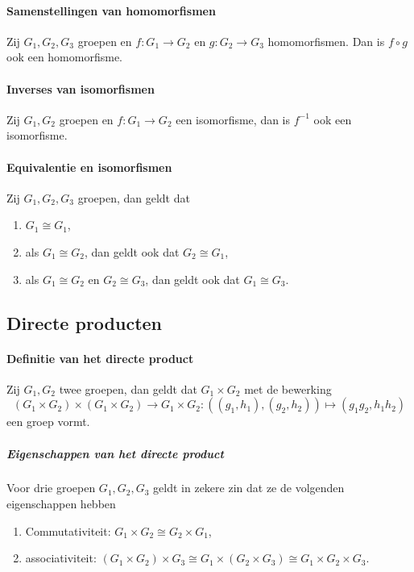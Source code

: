 \paragraph{Samenstellingen van homomorfismen} Zij \(G_{1},G_{2},G_{3}\) groepen en \(f\colon G_{1}\to G_{2}\) en \(g\colon G_{2}\to G_{3}\) homomorfismen. Dan is \(f\circ g\) ook een homomorfisme.

\paragraph{Inverses van isomorfismen} Zij \(G_{1},G_{2}\) groepen en \(f\colon G_{1}\to G_{2}\) een isomorfisme, dan is \(f^{-1}\) ook een isomorfisme.

\paragraph{Equivalentie en isomorfismen} Zij \(G_{1},G_{2},G_{3}\) groepen, dan geldt dat
\begin{enumerate}
    \item \(G_{1}\cong G_{1}\),
    \item als \(G_{1}\cong G_{2}\), dan geldt ook dat \(G_{2}\cong G_{1}\),
    \item als \(G_{1}\cong G_{2}\) en \(G_{2}\cong G_{3}\), dan geldt ook dat \(G_{1}\cong G_{3}\).
\end{enumerate}

\subsection{Directe producten}
\paragraph{Definitie van het directe product} Zij \(G_{1},G_{2}\) twee groepen, dan geldt dat \(G_{1}\times G_{2}\) met de bewerking
\[
    (G_{1}\times G_{2})\times(G_{1}\times G_{2})\to G_{1}\times G_{2}\colon ((g_{1},h_{1}),(g_{2},h_{2}))\mapsto (g_{1}g_{2},h_{1}h_{2})
\]
een groep vormt.

\subparagraph{Eigenschappen van het directe product} Voor drie groepen \(G_{1},G_{2},G_{3}\) geldt in zekere zin dat ze de volgenden eigenschappen hebben
\begin{enumerate}
    \item Commutativiteit: \(G_{1}\times G_{2}\cong G_{2}\times G_{1}\),
    \item associativiteit: \((G_{1}\times G_{2})\times G_{3}\cong G_{1}\times(G_{2}\times G_{3})\cong G_{1}\times G_{2}\times G_{3}\).
\end{enumerate}

